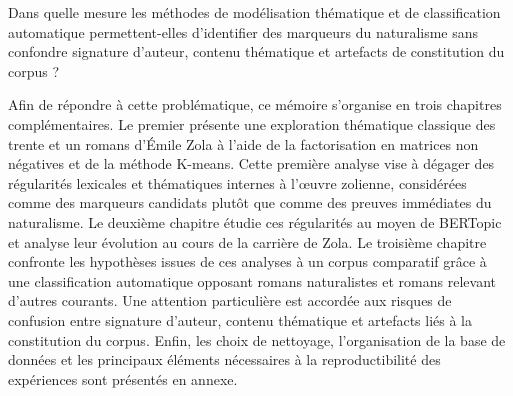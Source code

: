 Dans quelle mesure les méthodes de modélisation thématique et de classification automatique permettent-elles d’identifier des marqueurs du naturalisme sans confondre signature d’auteur, contenu thématique et artefacts de constitution du corpus ?

Afin de répondre à cette problématique, ce mémoire s’organise en trois chapitres complémentaires. Le premier présente une exploration thématique classique des trente et un romans d’Émile Zola à l’aide de la factorisation en matrices non négatives et de la méthode K-means. Cette première analyse vise à dégager des régularités lexicales et thématiques internes à l’œuvre zolienne, considérées comme des marqueurs candidats plutôt que comme des preuves immédiates du naturalisme. Le deuxième chapitre étudie ces régularités au moyen de BERTopic et analyse leur évolution au cours de la carrière de Zola. Le troisième chapitre confronte les hypothèses issues de ces analyses à un corpus comparatif grâce à une classification automatique opposant romans naturalistes et romans relevant d’autres courants. Une attention particulière est accordée aux risques de confusion entre signature d’auteur, contenu thématique et artefacts liés à la constitution du corpus. Enfin, les choix de nettoyage, l’organisation de la base de données et les principaux éléments nécessaires à la reproductibilité des expériences sont présentés en annexe.
